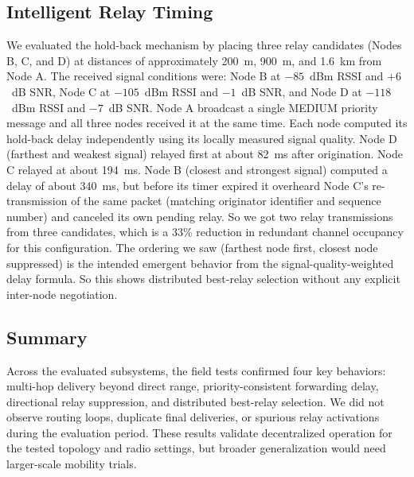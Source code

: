 \subsection{Intelligent Relay Timing}

We evaluated the hold-back mechanism by placing three relay candidates (Nodes B, C, and D) at distances of
approximately 200~m, 900~m, and 1.6~km from Node A. The received signal conditions were: Node B at $-85$~dBm
RSSI and $+6$~dB SNR, Node C at $-105$~dBm RSSI and $-1$~dB SNR, and Node D at $-118$~dBm RSSI and $-7$~dB
SNR. Node A broadcast a single MEDIUM priority message and all three nodes received it at the same time. Each
node computed its hold-back delay independently using its locally measured signal quality. Node D (farthest and
weakest signal) relayed first at about 82~ms after origination. Node C relayed at about 194~ms. Node B (closest
and strongest signal) computed a delay of about 340~ms, but before its timer expired it overheard Node C's
re-transmission of the same packet (matching originator identifier and sequence number) and canceled its own
pending relay. So we got two relay transmissions from three candidates, which is a 33\% reduction in redundant
channel occupancy for this configuration. The ordering we saw (farthest node first, closest node suppressed) is
the intended emergent behavior from the signal-quality-weighted delay formula. So this shows distributed
best-relay selection without any explicit inter-node negotiation.

\subsection{Summary}

Across the evaluated subsystems, the field tests confirmed four key behaviors: multi-hop delivery beyond direct
range, priority-consistent forwarding delay, directional relay suppression, and distributed best-relay
selection. We did not observe routing loops, duplicate final deliveries, or spurious relay activations during
the evaluation period. These results validate decentralized operation for the tested topology and radio
settings, but broader generalization would need larger-scale mobility trials.